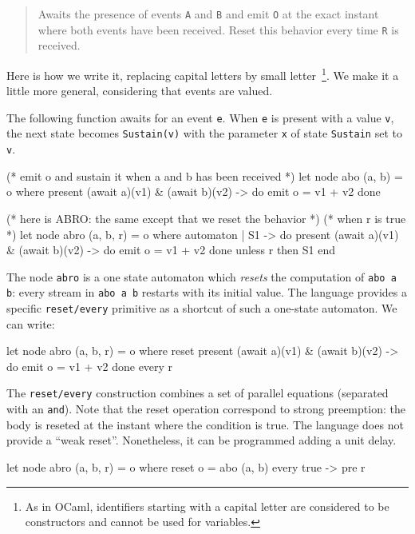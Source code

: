 \documentclass[11pt,titlepage,twoside]{report}
\newcommand{\ocaml}{{\sf OCaml}}
\begin{document}
\begin{quote}
Awaits the presence of events \verb-A- and \verb-B- and emit \verb-O-
at the exact instant where both events have been received.  Reset this
behavior every time \verb-R- is received.
\end{quote}
Here is how we write it, replacing capital letters by small
letter~\footnote{As in \ocaml, identifiers starting with a capital
  letter are considered to be constructors and cannot be used for
  variables.}. We make it a little more general, considering that
events are valued.

The following function awaits for an event \texttt{e}. When \texttt{e} is present with
a value \texttt{v}, the next state becomes \texttt{Sustain(v)} with the parameter
\texttt{x} of state \texttt{Sustain} set to \texttt{v}.
\begin{chklisting}[withresult,include=await,label=abo]
(* emit o and sustain it when a and b has been received *)
let node abo (a, b) = o where
  present (await a)(v1) & (await b)(v2) -> do emit o = v1 + v2 done
\end{chklisting}
%
\begin{chklisting}
(* here is ABRO: the same except that we reset the behavior *)
(* when r is true *)
let node abro (a, b, r) = o where
  automaton
  | S1 ->
       do present (await a)(v1) & (await b)(v2) -> do emit o = v1 + v2 done
       unless r then S1
  end
\end{chklisting}

The node \verb-abro- is a one state automaton which {\em resets} the
computation of \verb-abo a b-: every stream in \verb-abo a b- restarts
with its initial value. The language provides a specific
\verb-reset/every- primitive as a shortcut of such a one-state
automaton. We can write:
\begin{chklisting}[withresult,include=await]
let node abro (a, b, r) = o where
  reset
    present (await a)(v1) & (await b)(v2) -> do emit o = v1 + v2 done
  every r
\end{chklisting}

The \verb-reset/every- construction combines a set of parallel
equations (separated with an \verb-and-). Note that the reset
operation correspond to strong preemption: the body is reseted at the
instant where the condition is true. The language does not provide a
``weak reset''. Nonetheless, it can be programmed adding a unit delay.
\begin{chklisting}[withresult,include=abo]
  let node abro (a, b, r) = o where
    reset
      o = abo (a, b)
    every true -> pre r
\end{chklisting}
\end{document}

